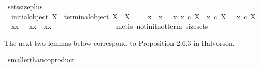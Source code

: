 \begin{isabellebody}
\endisatagproof
{\isafoldproof}%
%
\isadelimproof
\isanewline
%
\endisadelimproof
\isanewline
{}\isamarkupfalse%
\ sets{\isacharunderscore}{\kern0pt}size{\isacharunderscore}{\kern0pt}{}{\isacharunderscore}{\kern0pt}plus{\isacharcolon}{\kern0pt}\isanewline
\ \ {\isachardoublequoteopen}{\isacharparenleft}{\kern0pt}{\isasymnot}{\isacharparenleft}{\kern0pt}initial{\isacharunderscore}{\kern0pt}object\ X{\isacharparenright}{\kern0pt}\ {\isasymand}\ {\isasymnot}{\isacharparenleft}{\kern0pt}terminal{\isacharunderscore}{\kern0pt}object\ X{\isacharparenright}{\kern0pt}\ {\isasymand}\ {\isasymnot}{\isacharparenleft}{\kern0pt}X\ {\isasymcong}\ {\isasymOmega}{\isacharparenright}{\kern0pt}{\isacharparenright}{\kern0pt}\ {\isacharequal}{\kern0pt}\ {\isacharparenleft}{\kern0pt}{\isasymexists}\ x{}{\isachardot}{\kern0pt}\ {\isacharparenleft}{\kern0pt}{\isasymexists}\ x{}{\isachardot}{\kern0pt}\ \ {\isasymexists}\ x{}{\isachardot}{\kern0pt}\ {\isacharparenleft}{\kern0pt}{\isacharparenleft}{\kern0pt}x{}\ {\isasymin}\isactrlsub c\ X{\isacharparenright}{\kern0pt}\ {\isasymand}\ {\isacharparenleft}{\kern0pt}x{}\ {\isasymin}\isactrlsub c\ X{\isacharparenright}{\kern0pt}\ {\isasymand}\ \ {\isacharparenleft}{\kern0pt}x{}\ {\isasymin}\isactrlsub c\ X{\isacharparenright}{\kern0pt}\ {\isasymand}\ {\isacharparenleft}{\kern0pt}x{}{\isasymnoteq}x{}{\isacharparenright}{\kern0pt}\ {\isasymand}\ \ {\isacharparenleft}{\kern0pt}x{}{\isasymnoteq}x{}{\isacharparenright}{\kern0pt}\ {\isasymand}\ {\isacharparenleft}{\kern0pt}x{}{\isasymnoteq}x{}{\isacharparenright}{\kern0pt}\ {\isacharparenright}{\kern0pt}\ \ \ \ \ \ \ \ \ \ \ \ \ {\isacharparenright}{\kern0pt}{\isacharparenright}{\kern0pt}{\isachardoublequoteclose}\isanewline
%
\isadelimproof
\ \ %
\endisadelimproof
%
\isatagproof
{}\isamarkupfalse%
\ {\isacharparenleft}{\kern0pt}metis\ not{\isacharunderscore}{\kern0pt}init{\isacharunderscore}{\kern0pt}not{\isacharunderscore}{\kern0pt}term\ size{\isacharunderscore}{\kern0pt}{}{\isacharunderscore}{\kern0pt}sets{\isacharparenright}{\kern0pt}%
\endisatagproof
{\isafoldproof}%
%
\isadelimproof
%
\endisadelimproof
%
\begin{isamarkuptext}%
The next two lemmas below correspond to Proposition 2.6.3 in Halvorson.%
\end{isamarkuptext}\isamarkuptrue%
\isamarkupfalse%
\ smaller{\isacharunderscore}{\kern0pt}than{\isacharunderscore}{\kern0pt}coproduct{}{\isacharcolon}{\kern0pt}\isanewline

\end{isabellebody}
